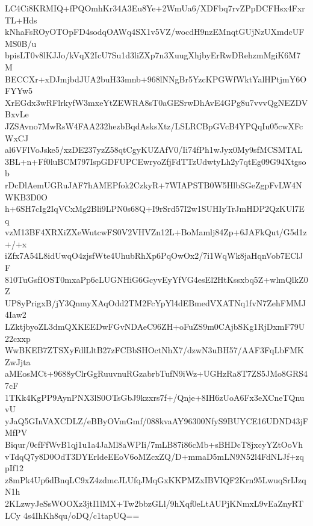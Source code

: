 LC4Ci8KRMIQ+fPQOmhKr34A3Eu8Ye+2WmUa6/XDFbq7rvZPpDCFHsx4FxrTL+Hds
kNhaFsROyOTOpFD4sodqOAWq4SX1v5VZ/wocdH9nzEMnqtGUjNzUXmdcUFMS0B/u
bpisLT0v8lKJJo/kVqX2IcU7Su1d3liZXp7n3XuugXhjbyErRwDRehzmMgiK6M7M
BECCXr+xDJmjbdJUA2buH33mnb+968lNNgBr5YzcKPGWfWktYalHPtjmY6OFYYw5
XrEGdx3wRFlrkyfW3mxeYtZEWRA8sT0aGESrwDhAvE4GPg8u7vvvQgNEZDVBxvLe
JZSAvno7MwRsW4FAA232hezbBqdAsksXtz/LSLRCBpGVcB4YPQqIu05cwXFcWxCJ
al6VFlVoJske5/xzDE237yzZ58qtCgyKUZAfV0/Ii74fPh1wJyx0My9sfMCSMTAL
3BL+n+Ff0luBCM797IspGDFUPCEwryoZfjFdTTzUdwtyLh2y7qtEg09G94Xtgsob
rDcDlAemUGRuJAF7hAMEPfok2CzkyR+7WIAPSTB0W5HlbSGeZgpFvLW4NWKB3D0O
h+6SH7cIg2IqVCxMg2Bli9LPN0s68Q+I9rSrd57I2w1SUHIyTrJmHDP2QzKUl7Eq
vzM13BF4XRXiZXeWutcwFS0V2VHVZn12L+BoMamlj84Zp+6JAFkQut/G5d1z+/+x
iZfx7A54L8idUwqO4zjsfWte4UhubRhXp6PqOwOx2/7i1WqWk8jaHqnVob7EClJF
810TuGsfIOST0mxaPp6cLUGNHiG6GcyvEyYfVG4esEl2HtKssxbq5Z+wlmQlkZ0Z
UP8yPrigxB/jY3QnmyXAqOdd2TM2FcYpYl4dEBmedVXATNq1fvN7ZehFMMJ4Iaw2
LZktjbyoZL3dmQXKEEDwFGvNDAeC96ZH+oFuZS9m0CAjbSKg1RjDxmF79U22cxxp
WwBKEB7ZTSXyFdlLltB27zFCBbSHOctNhX7/dzwN3uBH57/AAF3FqLbFMKZwJjta
aMEosMCt+9688yClrGgRuuvnuRGzabrbTufN9iWz+UGHzRa8T7ZS5JMo8GRS47cF
1TKk4KgPP9AynPNX3lS0OTsGbJ9kzxrs7f+/Qnje+8IH6zUoA6Fx3eXCneTQnuvU
yJaQ5GInVAXCDLZ/eBByOVmGmf/088kvaAY96300NfyS9BUYCE16UDND43jFMfPV
Biqur/0cfFfWvB1qj1u1a4JaMl8aWPIi/7mLB87i86cMb+sBHDcT8jxcyYZtOoVh
vTdqQ7y8D0OdT3DYErldeEEoV6oMZcxZQ/D+mmaD5mLN9N52l4FdNLJf+zqpIf12
z8mPk4Up6dBnqLC9xZ4zdmcJLUfqJMqGxKKPMZxIBVIQF2Krn95LwuqSrIJzqN1h
2KLzwyJeSsWOOXz3jtI1lMX+Tw2bbzGLl/9hXqf0eLtAUPjKNmxL9vEaZnyRTLCy
4s4IhKh8qu/oDQ/c1tapUQ==
